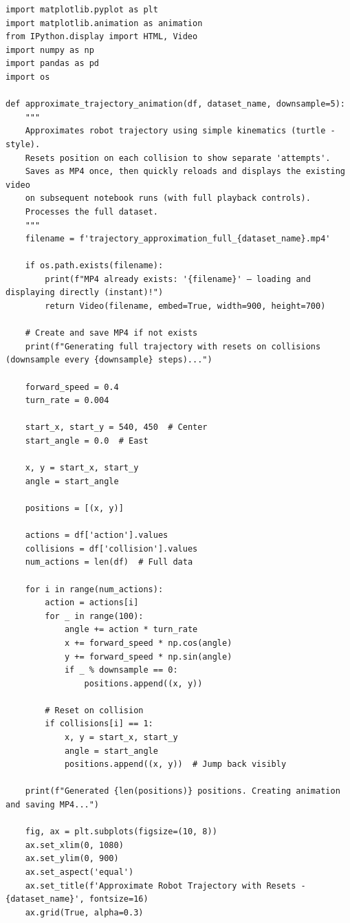 \begin{verbatim}
import matplotlib.pyplot as plt
import matplotlib.animation as animation
from IPython.display import HTML, Video
import numpy as np
import pandas as pd
import os

def approximate_trajectory_animation(df, dataset_name, downsample=5):
    """
    Approximates robot trajectory using simple kinematics (turtle -style).
    Resets position on each collision to show separate 'attempts'.
    Saves as MP4 once, then quickly reloads and displays the existing video
    on subsequent notebook runs (with full playback controls).
    Processes the full dataset.
    """
    filename = f'trajectory_approximation_full_{dataset_name}.mp4'
    
    if os.path.exists(filename):
        print(f"MP4 already exists: '{filename}' — loading and displaying directly (instant)!")
        return Video(filename, embed=True, width=900, height=700)
    
    # Create and save MP4 if not exists
    print(f"Generating full trajectory with resets on collisions (downsample every {downsample} steps)...")
    
    forward_speed = 0.4
    turn_rate = 0.004
    
    start_x, start_y = 540, 450  # Center
    start_angle = 0.0  # East
    
    x, y = start_x, start_y
    angle = start_angle
    
    positions = [(x, y)]
    
    actions = df['action'].values
    collisions = df['collision'].values
    num_actions = len(df)  # Full data
    
    for i in range(num_actions):
        action = actions[i]
        for _ in range(100):
            angle += action * turn_rate
            x += forward_speed * np.cos(angle)
            y += forward_speed * np.sin(angle)
            if _ % downsample == 0:
                positions.append((x, y))
        
        # Reset on collision
        if collisions[i] == 1:
            x, y = start_x, start_y
            angle = start_angle
            positions.append((x, y))  # Jump back visibly
    
    print(f"Generated {len(positions)} positions. Creating animation and saving MP4...")
    
    fig, ax = plt.subplots(figsize=(10, 8))
    ax.set_xlim(0, 1080)
    ax.set_ylim(0, 900)
    ax.set_aspect('equal')
    ax.set_title(f'Approximate Robot Trajectory with Resets - {dataset_name}', fontsize=16)
    ax.grid(True, alpha=0.3)
    

\end{verbatim}
